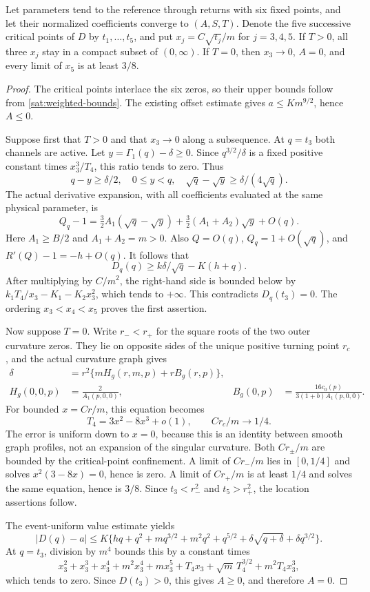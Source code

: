\begin{lemma}\label{lem:k4-event}
Let parameters tend to the reference through returns with six fixed points,
and let their normalized coefficients converge to $(A,S,T)$. Denote the five successive critical points of $D$
by $t_1,\ldots,t_5$, and put $x_j=C\sqrt{t_j}/m$ for $j=3,4,5$.
If $T>0$, all three $x_j$ stay in a compact subset of $(0,\infty)$.
If $T=0$, then $x_3\to0$, $A=0$, and every limit of $x_5$ is at least
$3/8$.
\end{lemma}
\begin{proof}
The critical points interlace the six zeros, so their upper bounds follow
from \eqref{sat:weighted-bounds}. The existing offset estimate gives
$a\le K m^{9/2}$, hence $A\le0$.

Suppose first that $T>0$ and that $x_3\to0$ along a subsequence.
At $q=t_3$ both channels are active. Let $y=\Gamma_1(q)-\delta\ge0$.
Since $q^{3/2}/\delta$ is a fixed positive constant times $x_3^3/T_4$,
this ratio tends to zero. Thus
\[
 q-y\ge\delta/2,\quad 0\le y<q,\quad
 \sqrt q-\sqrt y\ge\delta/(4\sqrt q).
\]
The actual derivative expansion, with all coefficients evaluated at the
same physical parameter, is
\[
 Q_q-1=\tfrac32A_1(\sqrt q-\sqrt y)
       +\tfrac32(A_1+A_2)\sqrt y+O(q).
\]
Here $A_1\ge B/2$ and $A_1+A_2=m>0$. Also $Q=O(q)$,
$Q_q=1+O(\sqrt q)$, and $R'(Q)-1=-h+O(q)$. It follows that
\[
 D_q(q)\ge k\delta/\sqrt q-K(h+q).
\]
After multiplying by $C/m^2$, the right-hand side is bounded below by
$k_1T_4/x_3-K_1-K_2x_3^2$, which tends to $+\infty$. This contradicts
$D_q(t_3)=0$. The ordering $x_3<x_4<x_5$ proves the first assertion.

Now suppose $T=0$. Write $r_-<r_+$ for the square roots of the two outer
curvature zeros. They lie on opposite sides of the unique positive
turning point $r_c$, and the actual curvature graph gives
\[
 \begin{aligned}
 \delta&=r^2\{mH_g(r,m,p)+rB_g(r,p)\},\\
 H_g(0,0,p)&=\frac{2}{A_1(p,0,0)},&
 B_g(0,p)&=\frac{16c_0(p)}{3(1+b)A_1(p,0,0)}.
 \end{aligned}
\]
For bounded $x=Cr/m$, this equation becomes
\[
 T_4=3x^2-8x^3+o(1),\qquad Cr_c/m\longrightarrow1/4.
\]
The error is uniform down to $x=0$, because this is an identity between
smooth graph profiles, not an expansion of the singular curvature.
Both $Cr_\pm/m$ are bounded by the critical-point confinement. A limit
of $Cr_-/m$ lies in $[0,1/4]$ and solves $x^2(3-8x)=0$, hence is zero.
A limit of $Cr_+/m$ is at least $1/4$ and solves the same equation, hence
is $3/8$. Since $t_3<r_-^2$ and $t_5>r_+^2$, the location assertions follow.

The event-uniform value estimate yields
\[
 |D(q)-a|\le K\{hq+q^2+mq^{3/2}+m^2q^2+q^{5/2}
                +\delta\sqrt{q+\delta}+\delta q^{3/2}\}.
\]
At $q=t_3$, division by $m^4$ bounds this by a constant times
\[
 x_3^2+x_3^3+x_3^4+m^2x_3^4+mx_3^5
 +T_4x_3+\sqrt m\,T_4^{3/2}+m^2T_4x_3^3,
\]
which tends to zero. Since $D(t_3)>0$, this gives $A\ge0$, and therefore
$A=0$.
\end{proof}

